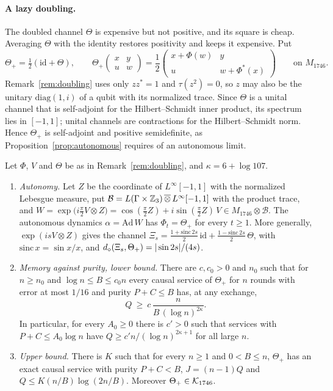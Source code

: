 \paragraph{A lazy doubling.} The doubled channel $\Theta$ is expensive but not positive, and its square is cheap. Averaging $\Theta$ with the
identity restores positivity and keeps it expensive. Put
\[
\Theta_+=\tfrac12(\mathrm{id}+\Theta),\qquad
\Theta_+\begin{pmatrix}x&y\\u&w\end{pmatrix}=\frac12\begin{pmatrix}x+\Phi(w)&y\\u&w+\Phi^*(x)\end{pmatrix}\qquad\text{on }M_{1746}.
\]
Remark~\ref{rem:doubling} uses only $zz^*=1$ and $\tau(z^2)=0$, so $z$ may also be the unitary $\mathrm{diag}(1,i)$ of a qubit with its
normalized trace. Since $\Theta$ is a unital channel that is self-adjoint for the Hilbert--Schmidt inner product, its spectrum lies in $[-1,1]$;
unital channels are contractions for the Hilbert--Schmidt norm. Hence $\Theta_+$ is self-adjoint and positive semidefinite, as
Proposition~\ref{prop:autonomous} requires of an autonomous limit.

\begin{proposition}\label{prop:lazy}
Let $\Phi$, $V$ and $\Theta$ be as in Remark~\ref{rem:doubling}, and $\kappa=6+\log107$.
\begin{enumerate}[label=(\alph*),itemsep=1pt]
\item \emph{Autonomy.} Let $Z$ be the coordinate of $L^\infty[-1,1]$ with the normalized Lebesgue measure, put
$\mathcal B=L(\Gamma\times\mathbb Z_3)\,\overline\otimes\,L^\infty[-1,1]$ with the product trace, and
$W=\exp\bigl(i\tfrac\pi2V\otimes Z\bigr)=\cos(\tfrac\pi2Z)+i\sin(\tfrac\pi2Z)\,V\in M_{1746}\otimes\mathcal B$. The autonomous dynamics
$\alpha=\mathrm{Ad}\,W$ has $\Phi_t=\Theta_+$ for every $t\ge1$. More generally, $\exp(isV\otimes Z)$ gives the channel
$\Xi_s=\frac{1+\mathrm{sinc}\,2s}2\,\mathrm{id}+\frac{1-\mathrm{sinc}\,2s}2\,\Theta$, with $\mathrm{sinc}\,x=\sin x/x$, and
$d_\diamond(\Xi_s,\Theta_+)=|\sin2s|/(4s)$.
\item \emph{Memory against purity, lower bound.} There are $c,c_0>0$ and $n_0$ such that for $n\ge n_0$ and $\log n\le B\le c_0n$ every causal
service of $\Theta_+$ for $n$ rounds with error at most $1/16$ and purity $P+C\le B$ has, at any exchange,
\[
Q\ \ge\ c\,\frac n{B\,(\log n)^{2\kappa}} .
\]
In particular, for every $A_0\ge0$ there is $c'>0$ such that services with $P+C\le A_0\log n$ have $Q\ge c'n/(\log n)^{2\kappa+1}$ for all large $n$.
\item \emph{Upper bound.} There is $K$ such that for every $n\ge1$ and $0<B\le n$, $\Theta_+$ has an exact causal service with purity $P+C<B$,
$J=(n-1)Q$ and $Q\le K(n/B)\log(2n/B)$. Moreover $\Theta_+\in\mathcal K_{1746}$.
\end{enumerate}
\end{proposition}

